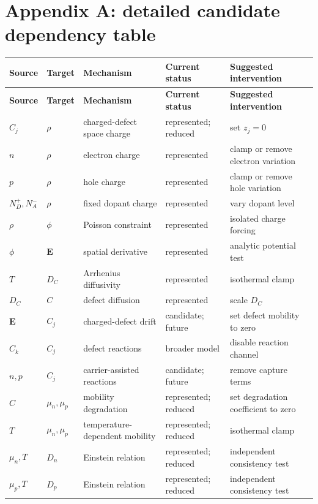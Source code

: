\documentclass[11pt]{article}
\newcommand{\Evec}{\bm{E}}
\begin{document}
\section{Appendix A: detailed candidate dependency table}

\small
\begin{longtable}{p{}p{}p{}p{}p{}}
\toprule
\textbf{Source} & \textbf{Target} & \textbf{Mechanism} & \textbf{Current status} & \textbf{Suggested intervention} \\
\midrule
\endfirsthead
\toprule
\textbf{Source} & \textbf{Target} & \textbf{Mechanism} & \textbf{Current status} & \textbf{Suggested intervention} \\
\midrule
\endhead
\(C_j\) & \(\rho\) & charged-defect space charge & represented; reduced & set \(z_j=0\) \\
\(n\) & \(\rho\) & electron charge & represented & clamp or remove electron variation \\
\(p\) & \(\rho\) & hole charge & represented & clamp or remove hole variation \\
\(N_D^+,N_A^-\) & \(\rho\) & fixed dopant charge & represented & vary dopant level \\
\(\rho\) & \(\phi\) & Poisson constraint & represented & isolated charge forcing \\
\(\phi\) & \(\Evec\) & spatial derivative & represented & analytic potential test \\
\(T\) & \(D_C\) & Arrhenius diffusivity & represented & isothermal clamp \\
\(D_C\) & \(C\) & defect diffusion & represented & scale \(D_C\) \\
\(\Evec\) & \(C_j\) & charged-defect drift & candidate; future & set defect mobility to zero \\
\(C_k\) & \(C_j\) & defect reactions & broader model & disable reaction channel \\
\(n,p\) & \(C_j\) & carrier-assisted reactions & candidate; future & remove capture terms \\
\(C\) & \(\mu_n,\mu_p\) & mobility degradation & represented; reduced & set degradation coefficient to zero \\
\(T\) & \(\mu_n,\mu_p\) & temperature-dependent mobility & represented; reduced & isothermal clamp \\
\(\mu_n,T\) & \(D_n\) & Einstein relation & represented; reduced & independent consistency test \\
\(\mu_p,T\) & \(D_p\) & Einstein relation & represented; reduced & independent consistency test \\

\end{longtable}
\end{document}
